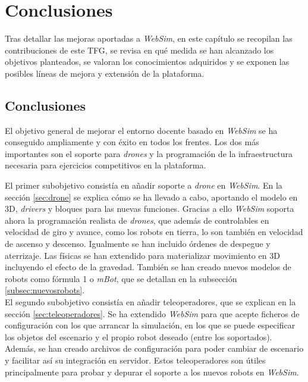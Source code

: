 \chapter{Conclusiones}
\label{chap:conclusiones}

Tras detallar las mejoras aportadas a \textit{WebSim}, en este capítulo se recopilan las contribuciones de este TFG, se revisa en qué medida se han alcanzado los objetivos planteados, se valoran los conocimientos adquiridos y se exponen las posibles líneas de mejora y extensión de la plataforma. 

\section{Conclusiones}
\label{sec:conclusiones}
El objetivo general de mejorar el entorno docente basado en \textit{WebSim} se ha conseguido ampliamente y con éxito en todos los frentes. Los dos más importantes son el soporte para \textit{drones} y la programación de la infraestructura necesaria para ejercicios competitivos en la plataforma. 

El primer subobjetivo consistía en añadir soporte a \textit{drone} en \textit{WebSim}. En la sección \ref{sec:drone} se explica cómo se ha llevado a cabo, aportando el modelo en 3D, \textit{drivers} y bloques para las nuevas funciones. Gracias a ello \textit{WebSim} soporta ahora la programación realista de \textit{drones}, que además de controlables en velocidad de giro y avance, como los robots en tierra, lo son también en velocidad de ascenso y descenso. Igualmente se han incluido órdenes de despegue y aterrizaje. Las físicas se han extendido para materializar movimiento en 3D incluyendo el efecto de la gravedad. También se han creado nuevos modelos de robots como fórmula 1 o \textit{mBot}, que se detallan en la subsección \ref{subsec:nuevosrobots}.\\

El segundo subobjetivo consistía en añadir teleoperadores, que se explican en la sección \ref{sec:teleoperadores}. Se ha extendido \textit{WebSim} para que acepte ficheros de configuración con los que arrancar la simulación, en los que se puede especificar los objetos del escenario y el propio robot deseado (entre los soportados). Además, se han creado archivos de configuración para poder cambiar de escenario y facilitar así su integración en servidor. Estos teleoperadores son útiles principalmente para probar y depurar el soporte a los nuevos robots en \textit{WebSim}.\\

